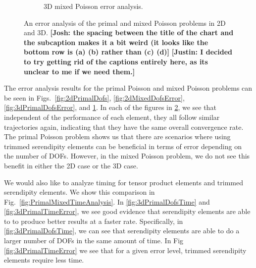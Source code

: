 \documentclass[manuscript,screen]{acmart}
\newcommand\josh[1]{\textbf{\textcolor[rgb]{0,.5,1}{[Josh: #1]}}}
\newcommand\justin[1]{\textbf{\textcolor[rgb]{0,1,0.5}{[Justin: #1]}}}
\begin{document}
\begin{figure}[h!]
\begin{subfigure}[h]{0.5\textwidth}
      \caption{3D mixed Poisson error analysis.}
    \label{fig:3dMixedDofsError}
  \end{subfigure}
  \caption{An error analysis of the primal and mixed Poisson problems in 2D and 3D.  \josh{the spacing between the title of the chart and the subcaption makes it a bit weird (it looks like the bottom row is (a) (b) rather than (c) (d)} \justin{I decided to try getting rid of the captions entirely here, as its unclear to me if we need them.}}
\label{fig:PrimalMixedErrorAnalysis}
\end{figure}


The error analysis results for the primal Poisson and mixed Poisson problems can be seen in Figs.~\ref{fig:2dPrimalDofs}, \ref{fig:2dMixedDofsError}, \ref{fig:3dPrimalDofsError}, and \ref{fig:3dMixedDofsError}.  In each of the figures in \ref{fig:PrimalMixedErrorAnalysis}, we see that independent of the performance of each element, they all follow similar trajectories again, indicating that they have the same overall convergence rate.  The primal Poisson problem shows us that there are scenarios where using trimmed serendipity elements can be beneficial in terms of error depending on the number of DOFs.  However, in the mixed Poisson problem, we do not see this benefit in either the 2D case or the 3D case.  

We would also like to analyze timing for tensor product elements and trimmed serendipity elements.  We show this comparison in Fig.~\ref{fig:PrimalMixedTimeAnalysis}.  In \ref{fig:3dPrimalDofsTime} and \ref{fig:3dPrimalTimeError}, we see good evidence that serendipity elements are able to to produce better results at a faster rate.  Specifically, in \ref{fig:3dPrimalDofsTime}, we can see that serendipity elements are able to do a larger number of DOFs in the same amount of time.  In Fig \ref{fig:3dPrimalTimeError} we see that for a given error level, trimmed serendipity elements require less time.
\end{document}
